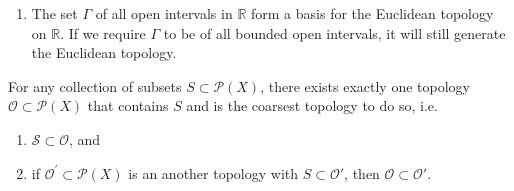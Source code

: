 \begin{exmbox}
    \begin{example}
        \begin{enumerate}
            \item The set \(\Gamma\) of all open intervals in \(\mathbb{R}\) form a basis for the Euclidean topology on \(\mathbb{R}\). If we require \(\Gamma\) to be of all bounded open intervals, it will still generate the Euclidean topology.
        \end{enumerate}
    \end{example}
\end{exmbox}

\begin{thmbox}
    \begin{lemma}
    For any collection of subsets \(S \subset \mathcal{P}(X)\), there exists exactly one topology \(\mathcal{O} \subset \mathcal{P}(X)\) that contains \(S\) and is the coarsest topology to do so, i.e.
    \begin{enumerate}
        \item \(\mathcal{S} \subset \mathcal{O}\), and
        \item if \(\mathcal{O}^\prime \subset \mathcal{P}(X)\) is an another topology with \(S \subset \mathcal{O}'\), then \(\mathcal{O} \subset \mathcal{O}'\).
    \end{enumerate}
    \end{lemma}
\end{thmbox}

